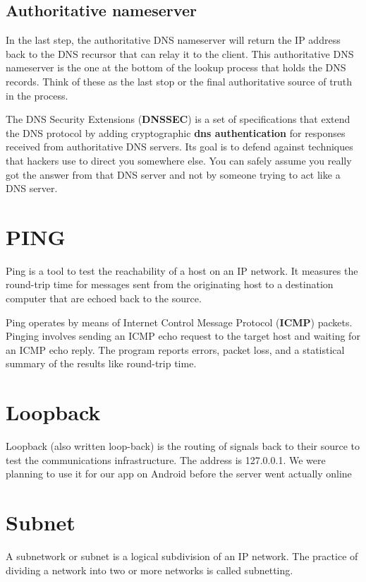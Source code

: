 \documentclass[a4paper,12pt]{book}
\begin{document}
\subsection{Authoritative nameserver}

In the last step, the authoritative DNS nameserver will return the IP address back to the DNS recursor that can relay it to the client. This authoritative DNS nameserver is the one at the bottom of the lookup process that holds the DNS records. Think of these as the last stop or the final authoritative source of truth in the process.

The DNS Security Extensions (\textbf{DNSSEC}) is a set of specifications that extend the DNS protocol by adding cryptographic \textbf{dns authentication} for responses received from authoritative DNS servers. Its goal is to defend against techniques that hackers use to direct you somewhere else. You can safely assume you really got the answer from that DNS server and not by someone trying to act like a DNS server. 

\section{PING}
Ping is a tool to test the reachability of a host on an IP network. It measures the round-trip time for messages sent from the originating host to a destination computer that are echoed back to the source.

Ping operates by means of Internet Control Message Protocol (\textbf{ICMP}) packets. Pinging involves sending an ICMP echo request to the target host and waiting for an ICMP echo reply. The program reports errors, packet loss, and a statistical summary of the results like round-trip time.

\section{Loopback}
Loopback (also written loop-back) is the routing of signals back to their source to test the communications infrastructure. The address is 127.0.0.1. We were planning to use it for our app on Android before the server went actually online

\section{Subnet}
A subnetwork or subnet is a logical subdivision of an IP network. The practice of dividing a network into two or more networks is called subnetting.
\end{document}

